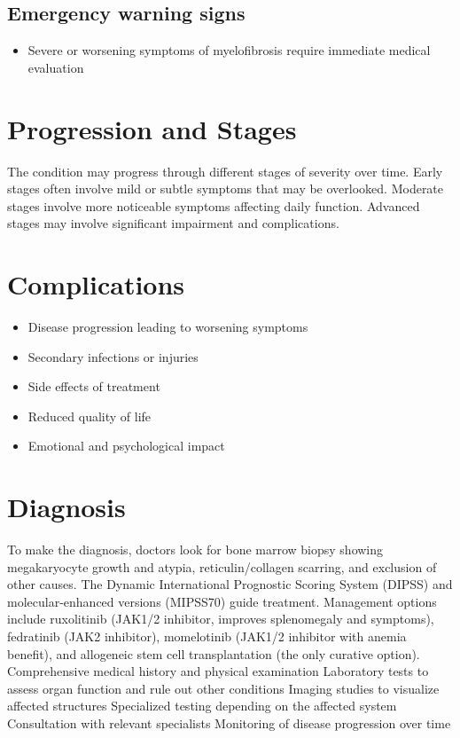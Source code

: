 \subsection{Emergency warning signs}
\begin{itemize}[noitemsep]
  \item Severe or worsening symptoms of myelofibrosis require immediate medical evaluation
\end{itemize}
\section{Progression and Stages}
The condition may progress through different stages of severity over time. Early stages often involve mild or subtle symptoms that may be overlooked. Moderate stages involve more noticeable symptoms affecting daily function. Advanced stages may involve significant impairment and complications.
\section{Complications}
\begin{itemize}[noitemsep]
  \item Disease progression leading to worsening symptoms
  \item Secondary infections or injuries
  \item Side effects of treatment
  \item Reduced quality of life
  \item Emotional and psychological impact
\end{itemize}
\section{Diagnosis}
To make the diagnosis, doctors look for bone marrow biopsy showing megakaryocyte growth and atypia, reticulin/collagen scarring, and exclusion of other causes. The Dynamic International Prognostic Scoring System (DIPSS) and molecular-enhanced versions (MIPSS70) guide treatment. Management options include ruxolitinib (JAK1/2 inhibitor, improves splenomegaly and symptoms), fedratinib (JAK2 inhibitor), momelotinib (JAK1/2 inhibitor with anemia benefit), and allogeneic stem cell transplantation (the only curative option). Comprehensive medical history and physical examination Laboratory tests to assess organ function and rule out other conditions Imaging studies to visualize affected structures Specialized testing depending on the affected system Consultation with relevant specialists Monitoring of disease progression over time


